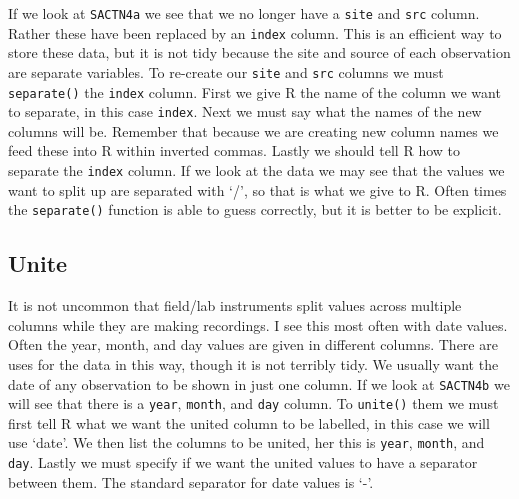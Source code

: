 \documentclass[]{book}
\newenvironment{Shaded}{\begin{snugshade}}{\end{snugshade}}
\newcommand{\KeywordTok}[1]{\textcolor[rgb]{0.13,0.29,0.53}{\textbf{#1}}}
\newcommand{\DataTypeTok}[1]{\textcolor[rgb]{0.13,0.29,0.53}{#1}}
\newcommand{\StringTok}[1]{\textcolor[rgb]{0.31,0.60,0.02}{#1}}
\newcommand{\OperatorTok}[1]{\textcolor[rgb]{0.81,0.36,0.00}{\textbf{#1}}}
\newcommand{\NormalTok}[1]{#1}
\theoremstyle{definition}
\theoremstyle{definition}
\theoremstyle{definition}
\theoremstyle{remark}
\begin{document}
If we look at \texttt{SACTN4a} we see that we no longer have a
\texttt{site} and \texttt{src} column. Rather these have been replaced
by an \texttt{index} column. This is an efficient way to store these
data, but it is not tidy because the site and source of each observation
are separate variables. To re-create our \texttt{site} and \texttt{src}
columns we must \texttt{separate()} the \texttt{index} column. First we
give R the name of the column we want to separate, in this case
\texttt{index}. Next we must say what the names of the new columns will
be. Remember that because we are creating new column names we feed these
into R within inverted commas. Lastly we should tell R how to separate
the \texttt{index} column. If we look at the data we may see that the
values we want to split up are separated with `/', so that is what we
give to R. Often times the \texttt{separate()} function is able to guess
correctly, but it is better to be explicit.

\begin{Shaded}
\end{Shaded}

\subsection{Unite}\label{unite}

It is not uncommon that field/lab instruments split values across
multiple columns while they are making recordings. I see this most often
with date values. Often the year, month, and day values are given in
different columns. There are uses for the data in this way, though it is
not terribly tidy. We usually want the date of any observation to be
shown in just one column. If we look at \texttt{SACTN4b} we will see
that there is a \texttt{year}, \texttt{month}, and \texttt{day} column.
To \texttt{unite()} them we must first tell R what we want the united
column to be labelled, in this case we will use `date'. We then list the
columns to be united, her this is \texttt{year}, \texttt{month}, and
\texttt{day}. Lastly we must specify if we want the united values to
have a separator between them. The standard separator for date values is
`-'.
\end{document}
